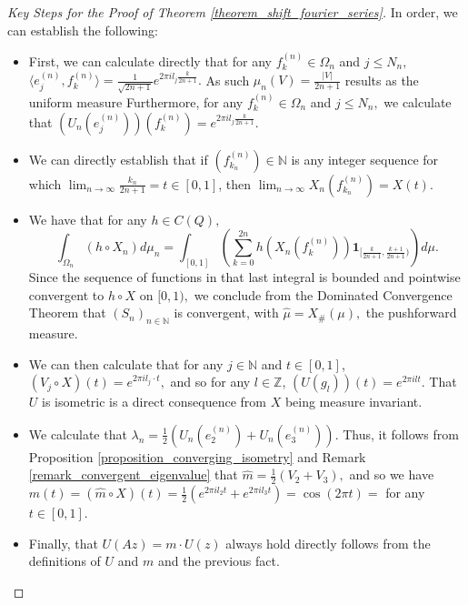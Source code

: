 \documentclass{amsart}
\theoremstyle{definition}
\theoremstyle{remark}
\def \HMU{\hat{\mu}}
\def \Hm{\hat{m}}
\def \LL{\langle}
\def \RR{\rangle}
\begin{document}
\begin{proof}[Key Steps for the Proof of Theorem \ref{theorem_shift_fourier_series}]
	In order, we can establish the following:
	\begin{itemize}
		\item First, we can calculate directly that for any $f_k^{(n)}\in \Omega_n$ and $j\leq N_n,$ $\LL e_j^{(n)}, f_k^{(n)} \RR= \frac{1}{\sqrt{2n+1}}e^{2\pi i l_j\frac{k}{2n+1}}.$ As such $\mu_n(V)=\frac{|V|}{2n+1}$ results as the uniform measure  Furthermore, for any $f_k^{(n)}\in\Omega_n$ and $j\leq N_n,$ we calculate that $(U_n(e_j^{(n)}))(f_k^{(n)})=e^{2\pi i l_j \frac{k}{2n+1}}$.
		\item We can directly establish that if $(f_{k_n}^{(n)})\in\mathbb{N}$ is any integer sequence for which $\lim_{n\rightarrow\infty} \frac{k_n}{2n+1}=t\in[0,1]$, then $\lim_{n\rightarrow\infty} X_n(f_{k_n}^{(n)})= X(t).$
		\item We have that for any $h\in C(Q),$ $$\int_{\Omega_n}(h\circ X_n)d\mu_n=\int_{[0,1]}\left(\sum_{k=0}^{2n}h(X_n(f_k^{(n)}))\mathbf{1}_{[\frac{k}{2n+1},\frac{k+1}{2n+1})}\right)d\mu.$$ Since the sequence of functions in that last integral is bounded and pointwise convergent to $h\circ X$ on $[0,1),$ we conclude from the Dominated Convergence Theorem that $(S_n)_{n\in\mathbb{N}}$ is convergent, with $\HMU=X_{\#}(\mu),$ the pushforward measure.
		\item We can then calculate that for any $j\in\mathbb{N}$ and $t\in [0,1]$, $(V_j\circ X)(t)=e^{2\pi i l_j\cdot t},$ and so for any $l\in\mathbb{Z}$, $(U(g_l))(t)=e^{2\pi i l t}.$ That $U$ is isometric is a direct consequence from $X$ being measure invariant.
		\item We calculate that $\lambda_n=\frac{1}{2}\left(U_n(e_2^{(n)})+U_n(e_3^{(n)})\right).$ Thus, it follows from Proposition \ref{proposition_converging_isometry} and Remark \ref{remark_convergent_eigenvalue} that $\Hm= \frac{1}{2}\left(V_2+V_3\right),$ and so we have $m(t)=(\Hm\circ X)(t)=\frac{1}{2}\left(e^{2\pi i l_2 t}+e^{2\pi i l_3 t}\right)=\cos(2\pi t)=$ for any $t\in [0,1].$
		\item Finally, that $U(Az)=m\cdot U(z)$ always hold directly follows from the definitions of $U$ and $m$ and the previous fact.
	\end{itemize}
\end{proof}
\end{document}
